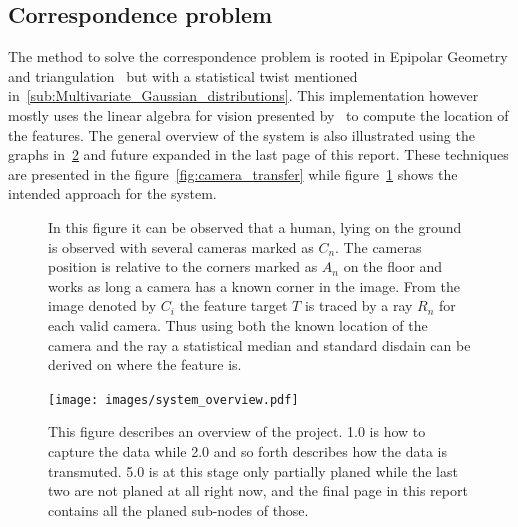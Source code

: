 \subsection{Correspondence problem}
The method to solve the correspondence problem is rooted in  Epipolar Geometry and triangulation~\cite{siciliano2010robotics} but with a statistical twist mentioned in~\ref{sub:Multivariate_Gaussian_distributions}.
This implementation however mostly uses the linear algebra for vision presented by~\cite{corke2017robotics} to compute the location of the features.
The general overview of the system is also illustrated using the graphs in~\ref{fig:method:overview} and future expanded in the last page of this report.
These techniques are presented in the figure~\ref{fig:camera_transfer} while figure~\ref{fig:3Dhuman} shows the intended approach for the system.
\def\svgwidth{\columnwidth}
\begin{figure}[ht]
    \centering
           
           \caption{
               In this figure it can be observed that a human, lying on the ground is observed with several cameras marked as $C_n$.
               The cameras position is relative to the \aruco corners marked as $A_n$ on the floor and works as long a camera has a known \aruco corner in the image.
               From the image denoted by
               $C_i$
               the feature target $T$ is traced by a ray $R_n$ for each valid camera.
               Thus using both the known location of the camera and the ray a statistical median and standard disdain can be derived on where the feature is.
           }
    \label{fig:3Dhuman}
\end{figure}


\begin{figure}[b]
    \begin{center}
        \texttt{[image: images/system\_overview.pdf]}
    \end{center}
    \caption{
        This figure describes an overview of the project. 1.0 is how to capture the data while 2.0 and so forth describes how the data is transmuted.
        5.0 is at this stage only partially planed while the last two are not planed at all right now, and the final page in this report contains all the planed sub-nodes of those.
    }
    \label{fig:method:overview}
\end{figure}



